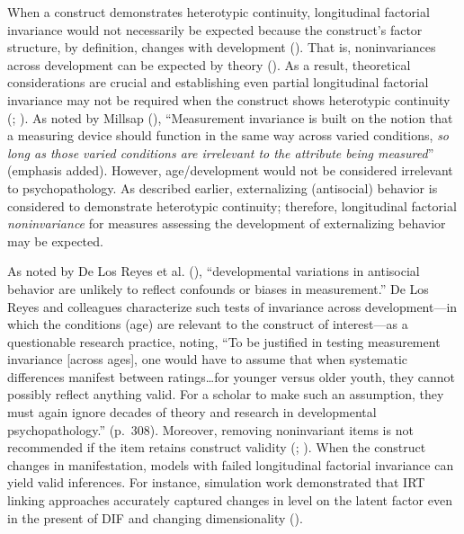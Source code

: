 \documentclass[
  american,
  letterpaper,
  12pt]{article}
\begin{document}
When a construct demonstrates heterotypic continuity, longitudinal
factorial invariance would not necessarily be expected because the
construct's factor structure, by definition, changes with development
(). That is,
noninvariances across development can be expected by theory
(). As a result,
theoretical considerations are crucial and establishing even partial
longitudinal factorial invariance may not be required when the construct
shows heterotypic continuity (; ). As noted by
Millsap (), ``Measurement
invariance is built on the notion that a measuring device should
function in the same way across varied conditions, \emph{so long as
those varied conditions are irrelevant to the attribute being
measured}'' (emphasis added). However, age/development would not be
considered irrelevant to psychopathology. As described earlier,
externalizing (antisocial) behavior is considered to demonstrate
heterotypic continuity; therefore, longitudinal factorial
\emph{noninvariance} for measures assessing the development of
externalizing behavior may be expected.

As noted by De Los Reyes et al. (), ``developmental variations in antisocial behavior are unlikely to
reflect confounds or biases in measurement.'' De Los Reyes and
colleagues characterize such tests of invariance across development---in
which the conditions (age) are relevant to the construct of
interest---as a questionable research practice, noting, ``To be
justified in testing measurement invariance {[}across ages{]}, one would
have to assume that when systematic differences manifest between
ratings\ldots for younger versus older youth, they cannot possibly
reflect anything valid. For a scholar to make such an assumption, they
must again ignore decades of theory and research in developmental
psychopathology.'' (p.~308). Moreover, removing noninvariant items is
not recommended if the item retains construct validity
(;
). When the construct
changes in manifestation, models with failed longitudinal factorial
invariance can yield valid inferences. For instance, simulation work
demonstrated that IRT linking approaches accurately captured changes in
level on the latent factor even in the present of DIF and changing
dimensionality ().
\end{document}
